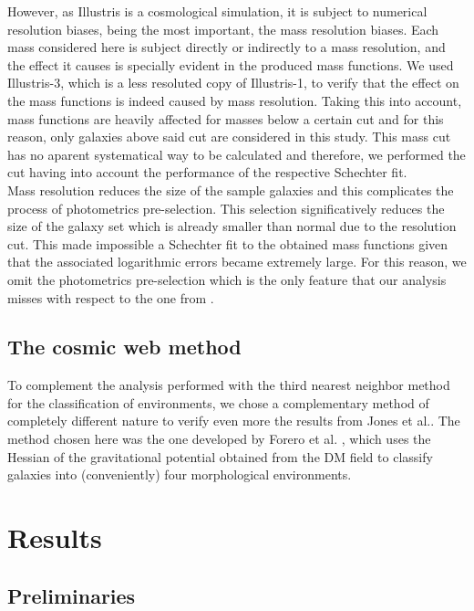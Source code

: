 \documentclass[a4paper,fleqn,usenatbib]{mnras}
\begin{document}
However, as Illustris is a cosmological simulation, it is subject to numerical resolution biases, being the most important, the mass resolution biases. Each mass considered here is subject directly or indirectly to a mass resolution, and the effect it causes is specially evident in the produced mass functions. We used Illustris-3, which is a less resoluted copy of Illustris-1, to verify that the effect on the mass functions is indeed caused by mass resolution. Taking this into account, mass functions are heavily affected for masses below a certain cut and for this reason, only galaxies above said cut are considered in this study. This mass cut has no aparent systematical way to be calculated and therefore, we performed the cut having into account the performance of the respective Schechter fit.\\

Mass resolution reduces the size of the sample galaxies and this complicates the process of photometrics pre-selection. This selection significatively reduces the size of the galaxy set which is already smaller than normal due to the resolution cut. This made impossible a Schechter fit to the obtained mass functions given that the associated logarithmic errors became extremely large. For this reason, we omit the photometrics pre-selection which is the only feature that our analysis misses with respect to the one from \cite{jones1}.\\

\subsection{The cosmic web method}
To complement the analysis performed with the third nearest neighbor method for the classification of environments, we chose a complementary method of completely different nature to verify even more the results from Jones et al.. The method chosen here was the one developed by Forero et al. \cite{forero1}, which uses the Hessian of the gravitational potential obtained from the DM field to classify galaxies into (conveniently) four morphological environments.\\ 

\section{Results}
\subsection{Preliminaries}
\end{document}
